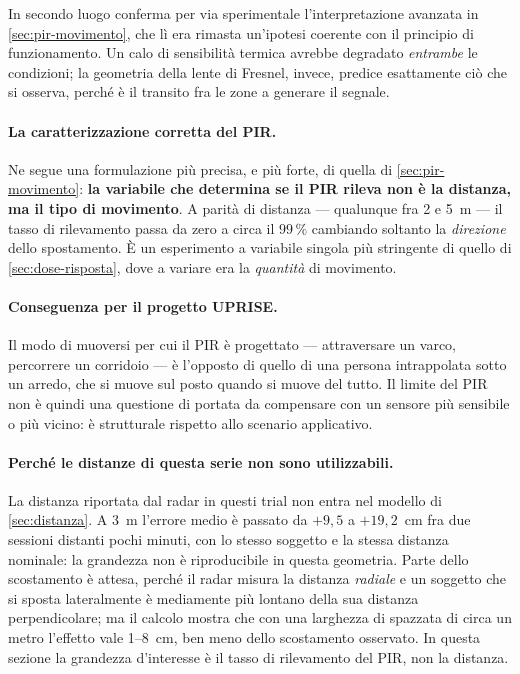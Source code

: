 In secondo luogo conferma per via sperimentale l'interpretazione avanzata in
\cref{sec:pir-movimento}, che lì era rimasta un'ipotesi coerente con il principio di
funzionamento. Un calo di sensibilità termica avrebbe degradato \emph{entrambe} le
condizioni; la geometria della lente di Fresnel, invece, predice esattamente ciò che
si osserva, perché è il transito fra le zone a generare il segnale.

\paragraph{La caratterizzazione corretta del PIR.} Ne segue una formulazione più
precisa, e più forte, di quella di \cref{sec:pir-movimento}: \textbf{la variabile che
determina se il PIR rileva non è la distanza, ma il tipo di movimento}. A parità di
distanza --- qualunque fra 2 e 5~m --- il tasso di rilevamento passa da zero a circa
il $99\,\%$ cambiando soltanto la \emph{direzione} dello spostamento. È un esperimento
a variabile singola più stringente di quello di \cref{sec:dose-risposta}, dove a
variare era la \emph{quantità} di movimento.

\paragraph{Conseguenza per il progetto UPRISE.} Il modo di muoversi per cui il PIR è
progettato --- attraversare un varco, percorrere un corridoio --- è l'opposto di
quello di una persona intrappolata sotto un arredo, che si muove sul posto quando si
muove del tutto. Il limite del PIR non è quindi una questione di portata da compensare
con un sensore più sensibile o più vicino: è strutturale rispetto allo scenario
applicativo.

\paragraph{Perché le distanze di questa serie non sono utilizzabili.} La distanza
riportata dal radar in questi trial non entra nel modello di
\cref{sec:distanza}. A 3~m l'errore medio è passato da $+9{,}5$ a $+19{,}2$~cm fra due
sessioni distanti pochi minuti, con lo stesso soggetto e la stessa distanza nominale:
la grandezza non è riproducibile in questa geometria. Parte dello scostamento è
attesa, perché il radar misura la distanza \emph{radiale} e un soggetto che si sposta
lateralmente è mediamente più lontano della sua distanza perpendicolare; ma il calcolo
mostra che con una larghezza di spazzata di circa un metro l'effetto vale 1--8~cm, ben
meno dello scostamento osservato. In questa sezione la grandezza d'interesse è il
tasso di rilevamento del PIR, non la distanza.

